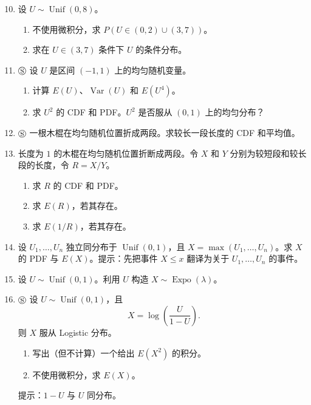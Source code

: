 \documentclass[UTF8, 12pt, fontset=fandol, oneside]{ctexart}
\begin{document}
\begin{enumerate}
  \setcounter{enumi}{9}
  \item 设 $U\sim\operatorname{Unif}(0,8)$。
  \begin{enumerate}
    \item 不使用微积分，求 $P(U\in(0,2)\cup(3,7))$。
    \item 求在 $U\in(3,7)$ 条件下 $U$ 的条件分布。
  \end{enumerate}

  \item $\circledS$ 设 $U$ 是区间 $(-1,1)$ 上的均匀随机变量。
  \begin{enumerate}
    \item 计算 $E(U)$、$\operatorname{Var}(U)$ 和 $E(U^4)$。
    \item 求 $U^2$ 的 CDF 和 PDF。$U^2$ 是否服从 $(0,1)$ 上的均匀分布？
  \end{enumerate}

  \item $\circledS$ 一根木棍在均匀随机位置折成两段。求较长一段长度的 CDF 和平均值。

  \item 长度为 $1$ 的木棍在均匀随机位置折断成两段。令 $X$ 和 $Y$ 分别为较短段和较长段的长度，令 $R=X/Y$。
  \begin{enumerate}
    \item 求 $R$ 的 CDF 和 PDF。
    \item 求 $E(R)$，若其存在。
    \item 求 $E(1/R)$，若其存在。
  \end{enumerate}

  \item 设 $U_1,\ldots,U_n$ 独立同分布于 $\operatorname{Unif}(0,1)$，且 $X=\max(U_1,\ldots,U_n)$。求 $X$ 的 PDF 与 $E(X)$。提示：先把事件 $X\le x$ 翻译为关于 $U_1,\ldots,U_n$ 的事件。

  \item 设 $U\sim\operatorname{Unif}(0,1)$。利用 $U$ 构造 $X\sim\operatorname{Expo}(\lambda)$。

  \item $\circledS$ 设 $U\sim\operatorname{Unif}(0,1)$，且
  \[
    X=\log\left(\frac{U}{1-U}\right).
  \]
  则 $X$ 服从 Logistic 分布。
  \begin{enumerate}
    \item 写出（但不计算）一个给出 $E(X^2)$ 的积分。
    \item 不使用微积分，求 $E(X)$。
  \end{enumerate}
  提示：$1-U$ 与 $U$ 同分布。


\end{enumerate}
\end{document}
